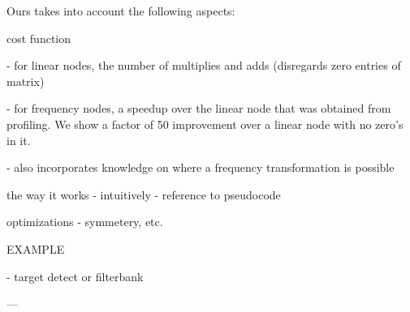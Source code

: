 Ours takes into account the following aspects:

cost function

  - for linear nodes, the number of multiplies and adds (disregards
    zero entries of matrix)

  - for frequency nodes, a speedup over the linear node that was
    obtained from profiling.  We show a factor of 50 improvement over
    a linear node with no zero's in it.

      - also incorporates knowledge on where a frequency
        transformation is possible

the way it works
  - intuitively
  - reference to pseudocode

optimizations
  - symmetery, etc.

EXAMPLE

- target detect or filterbank

---

